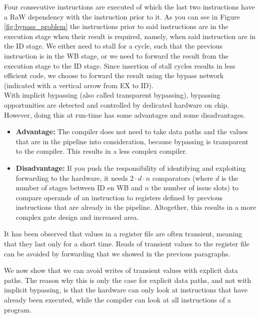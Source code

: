 Four consecutive instructions are executed of which the last two instructions have a RaW dependency with the instruction prior to it. As you can see in Figure \ref{fig:bypass_problem} the instructions prior to said instructions are in the execution stage when their result is required, namely, when said instruction are in the ID stage. We either need to stall for a cycle, such that the previous instruction is in the WB stage, or we need to forward the result from the execution stage to the ID stage. Since insertion of stall cycles results in less efficient code, we choose to forward the result using the bypass network (indicated with a vertical arrow from EX to ID).\\


With implicit bypassing (also called transparent bypassing), bypassing opportunities are detected and controlled by dedicated hardware on chip. However, doing this at run-time has some advantages and some disadvantages.
\begin{itemize}
\item \textbf{Advantage:} The compiler does not need to take data paths and the values that are in the pipeline into consideration, because bypassing is transparent to the compiler. This results in a less complex compiler.
\item \textbf{Disadvantage:} 
If you push the responsibility of identifying and exploiting forwarding to the hardware, it needs $2\cdot d\cdot n$ comparators (where $d$ is the number of stages between ID en WB and $n$ the number of issue slots) to compare operands of an instruction to registers defined by previous instructions that are already in the pipeline. Altogether, this results in a more complex gate design and increased area.
\end{itemize}

It has been observed that values in a register file are often transient, meaning that they last only for a short time.  Reads of transient values to the register file can be avoided by forwarding that we showed in the previous paragraphs.

We now show that we can avoid writes of transient values with explicit data paths. The reason why this is only the case for explicit data paths, and not with implicit bypassing, is that the hardware can only look at instructions that have already been executed, while the compiler can look at all instructions of a program.  









